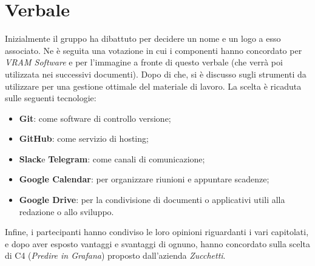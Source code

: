 \section{Verbale}
    Inizialmente il gruppo ha dibattuto per decidere un nome e un logo a esso associato. Ne è seguita una votazione in cui i componenti hanno
    concordato per \textit{VRAM Software} e per l'immagine a fronte di questo verbale (che verrà poi utilizzata nei successivi documenti). Dopo di che, si è discusso
    sugli strumenti da utilizzare per una gestione ottimale del materiale di lavoro. La scelta è ricaduta sulle seguenti tecnologie:
    \begin{itemize}
        \item \textbf{Git}\glo: come software di controllo versione;
        \item \textbf{GitHub}\glo: come servizio di hosting;
        \item \textbf{Slack}\glosp e \textbf{Telegram}\glo: come canali di comunicazione;
        \item \textbf{Google Calendar}\glo: per organizzare riunioni e appuntare scadenze;
        \item \textbf{Google Drive}\glo: per la condivisione di documenti o applicativi utili alla redazione o allo sviluppo.
    \end{itemize}
    Infine, i partecipanti hanno condiviso le loro opinioni riguardanti i vari capitolati\glo, e dopo aver esposto vantaggi e svantaggi di ognuno, hanno concordato sulla
    scelta di C4 (\textit{Predire in Grafana}) proposto dall'azienda \textit{Zucchetti}.